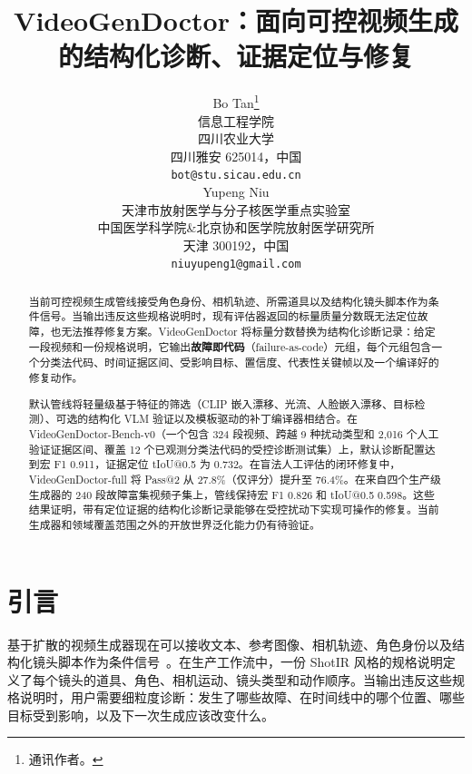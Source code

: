 \documentclass{article}
\begin{document}
\title{VideoGenDoctor：面向可控视频生成的结构化诊断、证据定位与修复}

\author{%
  Bo Tan\thanks{通讯作者。} \\
  信息工程学院\\
  四川农业大学\\
  四川雅安 625014，中国\\
  \texttt{bot@stu.sicau.edu.cn} \\
  \And
  Yupeng Niu \\
  天津市放射医学与分子核医学重点实验室\\
  中国医学科学院\&北京协和医学院放射医学研究所\\
  天津 300192，中国\\
  \texttt{niuyupeng1@gmail.com} \\
}

\maketitle

\begin{abstract}
当前可控视频生成管线接受角色身份、相机轨迹、所需道具以及结构化镜头脚本作为条件信号。当输出违反这些规格说明时，现有评估器返回的标量质量分数既无法定位故障，也无法推荐修复方案。VideoGenDoctor 将标量分数替换为结构化诊断记录：给定一段视频和一份规格说明，它输出\textbf{故障即代码}（failure-as-code）元组，每个元组包含一个分类法代码、时间证据区间、受影响目标、置信度、代表性关键帧以及一个编译好的修复动作。

默认管线将轻量级基于特征的筛选（CLIP 嵌入漂移、光流、人脸嵌入漂移、目标检测）、可选的结构化 VLM 验证以及模板驱动的补丁编译器相结合。在 VideoGenDoctor-Bench-v0（一个包含 324 段视频、跨越 9 种扰动类型和 2,016 个人工验证证据区间、覆盖 12 个已观测分类法代码的受控诊断测试集）上，默认诊断配置达到宏 F1 0.911，证据定位 tIoU@0.5 为 0.732。在盲法人工评估的闭环修复中，VideoGenDoctor-full 将 Pass@2 从 27.8\%（仅评分）提升至 76.4\%。在来自四个生产级生成器的 240 段故障富集视频子集上，管线保持宏 F1 0.826 和 tIoU@0.5 0.598。这些结果证明，带有定位证据的结构化诊断记录能够在受控扰动下实现可操作的修复。当前生成器和领域覆盖范围之外的开放世界泛化能力仍有待验证。
\end{abstract}


\section{引言}
\label{sec:intro}

基于扩散的视频生成器现在可以接收文本、参考图像、相机轨迹、角色身份以及结构化镜头脚本作为条件信号~\cite{cogvideox2024,svd2023,motionctrl2024,instructvideo2024}。在生产工作流中，一份 ShotIR 风格的规格说明定义了每个镜头的道具、角色、相机运动、镜头类型和动作顺序。当输出违反这些规格说明时，用户需要细粒度诊断：发生了哪些故障、在时间线中的哪个位置、哪些目标受到影响，以及下一次生成应该改变什么。
\end{document}
